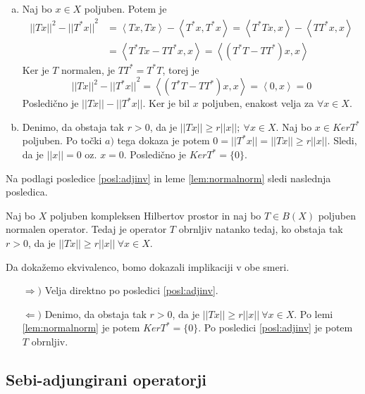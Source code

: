 \documentclass[mat2]{matdelo}
\newcommand{\abs}[1]{\ensuremath{\lvert #1 \rvert}}
\newcommand{\norm}[1]{\abs{\abs{#1}}}
\newcommand{\Sp}[2]{\ensuremath{\left<#1, #2\right>}}
\begin{document}
			\begin{dokaz}
				\begin{enumerate}[a)]
					\item Naj bo $x\in X$ poljuben. Potem je \begin{align*}
						\norm{Tx}^2 - \norm{T^*x}^2 &= \Sp{Tx}{Tx} - \Sp{T^*x}{T^*x} = \Sp{T^*Tx}{x} - \Sp{TT^*x}{x}\\
						&= \Sp{T^*Tx - TT^*x}{x} = \Sp{(T^*T - TT^*)x}{x}
					\end{align*}
					Ker je $T$ normalen, je $TT^* = T^*T$, torej je $$\norm{Tx}^2 - \norm{T^*x}^2 = \Sp{(T^*T - TT^*)x}{x} = \Sp{0}{x} = 0 $$
					Posledično je $\norm{Tx} - \norm{T^*x}$. Ker je bil $x$ poljuben, enakost velja za $\forall x\in X$.
					\item Denimo, da obstaja tak $r>0$, da je $\norm{Tx} \geq r\norm{x};~\forall x\in X$. Naj bo $x\in KerT^*$ poljuben. Po točki $a)$ tega dokaza je potem $0 = \norm{T^*x} = \norm{Tx} \geq r\norm{x}$. Sledi, da je $\norm{x} = 0$ oz. $x = 0$. Posledično je $KerT^* = \{0\}$.
				\end{enumerate}
			\end{dokaz}
			
			Na podlagi posledice \ref{posl:adjinv} in leme \ref{lem:normalnorm} sledi naslednja posledica.
			
			\begin{posledica}
				\label{posl:normalinv}
				Naj bo $X$ poljuben kompleksen Hilbertov prostor in naj bo $T\in B(X)$ poljuben normalen operator. Tedaj je operator $T$ obrnljiv natanko tedaj, ko obstaja tak $r > 0$, da je $\norm{Tx} \geq r\norm{x}~\forall x\in X$.
			\end{posledica}
			
			\begin{dokaz}
				Da dokažemo ekvivalenco, bomo dokazali implikaciji v obe smeri.
				\begin{itemize}
					\item[$\Rightarrow)$] Velja direktno po posledici \ref{posl:adjinv}.
					\item[$\Leftarrow)$] Denimo, da obstaja tak $r>0$, da je $\norm{Tx} \geq r\norm{x}~\forall x\in X$. Po lemi \ref{lem:normalnorm} je potem $KerT^* = \{0\}$. Po posledici \ref{posl:adjinv} je potem $T$ obrnljiv.
				\end{itemize}
			\end{dokaz}
			
			\subsection{Sebi-adjungirani operatorji}
			
\end{document}
